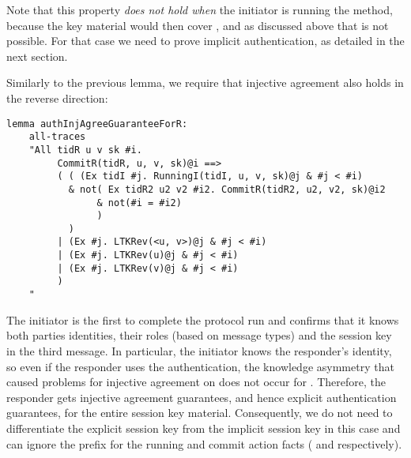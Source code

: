 Note that this property \emph{does not hold when} the initiator is
running the \mStat{} method, because the key material would then cover \mGiy{},
and as discussed above that is not possible.
%
For that case we need to prove implicit authentication, as detailed in
the next section.

Similarly to the previous lemma, we require that injective agreement also holds
in the reverse direction:
%

\begin{lstlisting}
lemma authInjAgreeGuaranteeForR:
    all-traces
    "All tidR u v sk #i.
         CommitR(tidR, u, v, sk)@i ==>
         ( ( (Ex tidI #j. RunningI(tidI, u, v, sk)@j & #j < #i)
           & not( Ex tidR2 u2 v2 #i2. CommitR(tidR2, u2, v2, sk)@i2
                & not(#i = #i2)
                )
           )
         | (Ex #j. LTKRev(<u, v>)@j & #j < #i)
         | (Ex #j. LTKRev(u)@j & #j < #i)
         | (Ex #j. LTKRev(v)@j & #j < #i)
         )
    "
\end{lstlisting}
%
The initiator is the first to complete the protocol run and confirms that
it knows both parties identities, their roles (based on message types) and the
session key in the third message.
%
In particular, the initiator knows the responder's identity, so even if the
responder uses the \mStat{} authentication, the knowledge asymmetry that caused
problems for injective agreement on \mGiy{} does not occur for \mGrx{}.
%
Therefore, the responder gets injective agreement guarantees, and hence explicit
authentication guarantees, for the entire session key material.
%
Consequently, we do not need to differentiate the explicit session key from the
implicit session key in this case and can ignore the  prefix for the
running and commit action facts ( and  respectively).
%
\\


